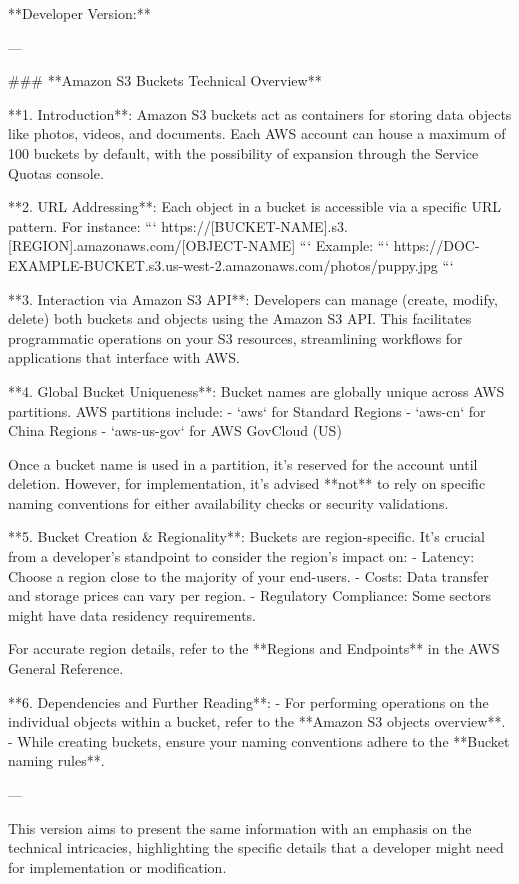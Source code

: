 **Developer Version:**

---

### **Amazon S3 Buckets Technical Overview**

**1. Introduction**:
Amazon S3 buckets act as containers for storing data objects like photos, videos, and documents. Each AWS account can house a maximum of 100 buckets by default, with the possibility of expansion through the Service Quotas console.

**2. URL Addressing**:
Each object in a bucket is accessible via a specific URL pattern. For instance:
```
https://[BUCKET-NAME].s3.[REGION].amazonaws.com/[OBJECT-NAME]
```
Example:
```
https://DOC-EXAMPLE-BUCKET.s3.us-west-2.amazonaws.com/photos/puppy.jpg
```

**3. Interaction via Amazon S3 API**:
Developers can manage (create, modify, delete) both buckets and objects using the Amazon S3 API. This facilitates programmatic operations on your S3 resources, streamlining workflows for applications that interface with AWS.

**4. Global Bucket Uniqueness**:
Bucket names are globally unique across AWS partitions. AWS partitions include:
- `aws` for Standard Regions
- `aws-cn` for China Regions
- `aws-us-gov` for AWS GovCloud (US)

Once a bucket name is used in a partition, it's reserved for the account until deletion. However, for implementation, it's advised **not** to rely on specific naming conventions for either availability checks or security validations.

**5. Bucket Creation & Regionality**:
Buckets are region-specific. It's crucial from a developer's standpoint to consider the region's impact on:
- Latency: Choose a region close to the majority of your end-users.
- Costs: Data transfer and storage prices can vary per region.
- Regulatory Compliance: Some sectors might have data residency requirements.

For accurate region details, refer to the **Regions and Endpoints** in the AWS General Reference.

**6. Dependencies and Further Reading**:
- For performing operations on the individual objects within a bucket, refer to the **Amazon S3 objects overview**.
- While creating buckets, ensure your naming conventions adhere to the **Bucket naming rules**.

---

This version aims to present the same information with an emphasis on the technical intricacies, highlighting the specific details that a developer might need for implementation or modification.